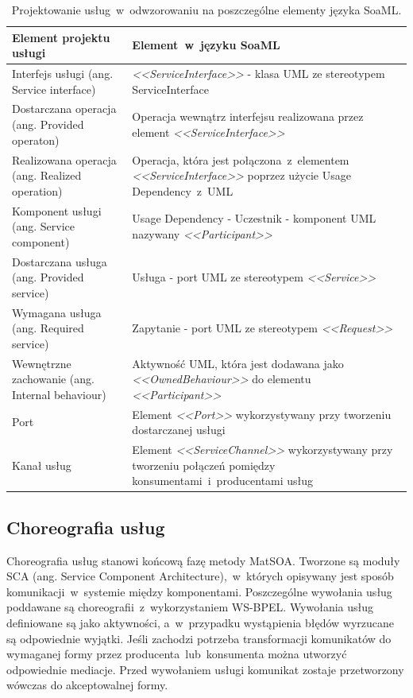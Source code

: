 \begin{table}[!htbp]
\begin{center}
\begin{small}
\begin{supertabular}{|p{6cm}|p{7cm}|}\hline
\textbf{Element projektu usługi} & \textbf{Element~w~języku SoaML}\\\hline
Interfejs usługi (ang. Service interface) &	\emph{<<ServiceInterface>>} - klasa UML ze stereotypem  ServiceInterface  \\\hline
Dostarczana operacja (ang. Provided operaton) &	Operacja wewnątrz interfejsu realizowana przez element \emph{<<ServiceInterface>>} \\\hline
Realizowana operacja (ang. Realized operation) &	Operacja, która jest połączona~z~elementem \emph{<<ServiceInterface>>} poprzez użycie Usage Dependency~z~UML \\\hline
Komponent usługi (ang. Service component) &	Usage Dependency - Uczestnik - komponent UML nazywany \emph{<<Participant>>} \\\hline
Dostarczana usługa (ang. Provided service) &	Usługa - port UML ze stereotypem \emph{<<Service>>}  \\\hline
Wymagana usługa (ang. Required service) &	Zapytanie - port UML ze stereotypem \emph{<<Request>>} \\\hline
Wewnętrzne zachowanie (ang. Internal behaviour) &	Aktywność UML, która jest dodawana jako \emph{<<OwnedBehaviour>>} do elementu \emph{<<Participant>>} \\\hline
Port &	Element \emph{<<Port>>} wykorzystywany przy tworzeniu dostarczanej usługi\\\hline
Kanał usług &	Element \emph{<<ServiceChannel>>} wykorzystywany przy tworzeniu połączeń pomiędzy konsumentami~i~producentami usług\\\hline
\end{supertabular}
\end{small}
\end{center}
 \caption{Projektowanie usług~w~odwzorowaniu na poszczególne elementy języka SoaML.}
 \label{tabela_service_projects_soaml}
\end{table}

\subsection{Choreografia usług}
Choreografia usług stanowi końcową fazę metody MatSOA. Tworzone są moduły SCA (ang. Service Component Architecture),~w~których opisywany jest sposób komunikacji~w~systemie między komponentami. Poszczególne wywołania usług poddawane są choreografii~z~wykorzystaniem WS-BPEL. Wywołania usług definiowane są jako aktywności, a~w~przypadku wystąpienia błędów wyrzucane są odpowiednie wyjątki. Jeśli zachodzi potrzeba transformacji komunikatów do wymaganej formy przez producenta~lub~konsumenta można utworzyć odpowiednie mediacje. Przed wywołaniem usługi komunikat zostaje przetworzony wówczas do akceptowalnej formy.

